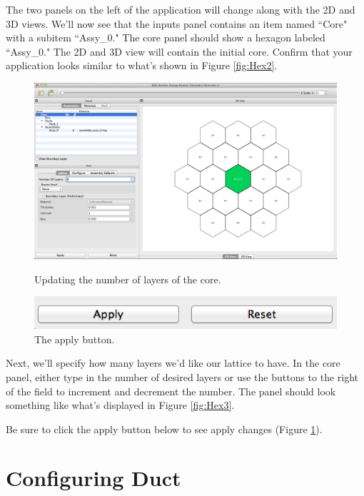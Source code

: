 The two panels on the left of the application will change along with the 2D and 3D views.  We'll now see that the inputs panel contains an item named ``Core" with a subitem ``Assy\_0."  The core panel should show a hexagon labeled ``Assy\_0."  The 2D and 3D view will contain the initial core. Confirm that your application looks similar to what's shown in Figure \ref{fig:Hex2}.

\begin{figure}
	\begin{center}
		\includegraphics[width=0.95\linewidth]{Images/hex-increase-core-layers.png}
		\caption{Updating the number of layers of the core.}
		\label{fig:Hex3}
	\end{center}
	\vspace{40pt}
	\begin{center}
		\includegraphics[width=0.8\linewidth]{Images/hex-apply-button.png}
		\caption{The apply button.}
		\label{fig:Hex4}
	\end{center}
	\vspace{-20pt}
\end{figure}

Next, we'll specify how many layers we'd like our lattice to have.  In the core panel, either type in the number of desired layers or use the buttons to the right of the field to increment and decrement the number.  The panel should look something like what's displayed in Figure \ref{fig:Hex3}.

Be sure to click the apply button below to see apply changes (Figure \ref{fig:Hex4}).

\section{Configuring Duct}

